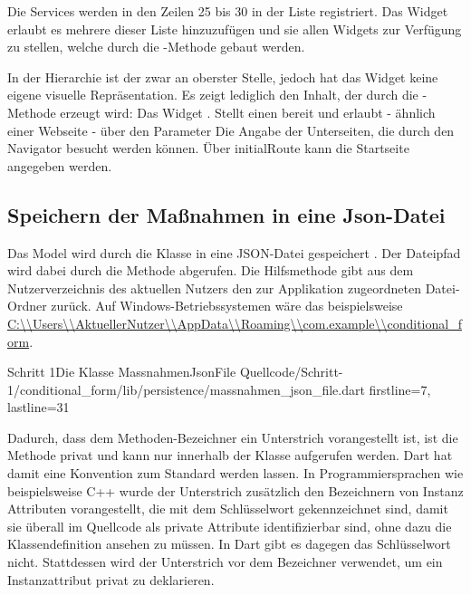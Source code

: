 {Die Services werden in den Zeilen 25 bis 30 in der Liste   registriert. Das Widget   erlaubt es mehrere  dieser Liste hinzuzufügen und sie allen Widgets zur Verfügung zu stellen, welche durch die -Methode  gebaut werden.





In der Hierarchie ist der   zwar an oberster Stelle, jedoch hat  das Widget keine eigene visuelle Repräsentation. Es zeigt lediglich den Inhalt, der durch die -Methode erzeugt wird: Das Widget  .  Stellt einen  bereit und erlaubt -  ähnlich einer Webseite - über den Parameter   Die Angabe der  Unterseiten, die durch den Navigator besucht werden können. Über initialRoute  kann die Startseite angegeben werden.


\subsection{Speichern der Maßnahmen in eine Json-Datei}
Das Model wird durch die Klasse  in eine JSON-Datei gespeichert \Lst{\ref{lst:Schritt1KlasseMassnahmenJsonFile}}. Der Dateipfad wird dabei durch die Methode   abgerufen. Die Hilfsmethode   gibt aus dem Nutzerverzeichnis des aktuellen Nutzers den zur Applikation zugeordneten Datei-Ordner zurück. Auf Windows-Betriebssystemen wäre das beispielsweise \url{C:\\Users\\AktuellerNutzer\\AppData\\Roaming\\com.example\\conditional_form}.

\begin{alexlisting}{Schritt 1}{Die Klasse MassnahmenJsonFile}
  {Quellcode/Schritt-1/conditional_form/lib/persistence/massnahmen_json_file.dart}
  {firstline=7, lastline=31}
  \label{lst:Schritt1KlasseMassnahmenJsonFile}
\end{alexlisting}

Dadurch, dass dem Methoden-Bezeichner  ein Unterstrich vorangestellt ist, ist die Methode privat und kann nur innerhalb der Klasse aufgerufen werden. Dart hat damit eine Konvention zum Standard werden lassen. In Programmiersprachen wie beispielsweise C++ wurde der Unterstrich zusätzlich den Bezeichnern von Instanz Attributen vorangestellt, die mit dem  Schlüsselwort gekennzeichnet sind, damit sie überall im Quellcode als private Attribute identifizierbar sind, ohne dazu die Klassendefinition ansehen zu müssen. In Dart gibt es dagegen das  Schlüsselwort nicht. Stattdessen wird der Unterstrich vor dem Bezeichner verwendet, um ein Instanzattribut privat zu deklarieren.

}
